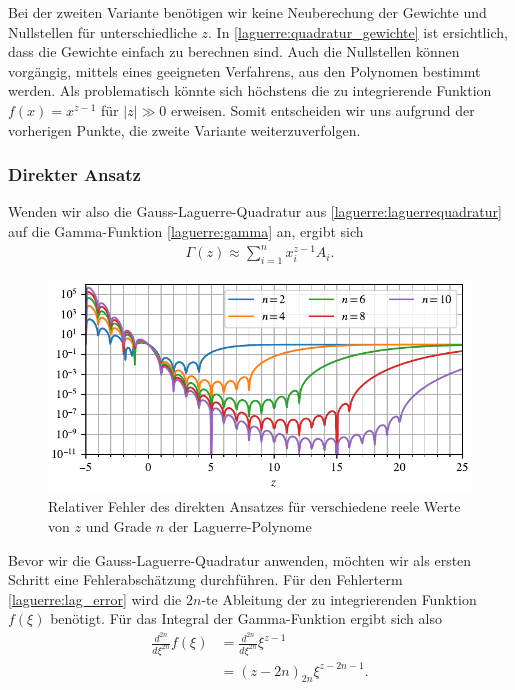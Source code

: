Bei der zweiten Variante benötigen wir keine Neuberechung der Gewichte
und Nullstellen für unterschiedliche $z$.
In \eqref{laguerre:quadratur_gewichte} ist ersichtlich,
dass die Gewichte einfach zu berechnen sind.
Auch die Nullstellen können vorgängig,
mittels eines geeigneten Verfahrens,
aus den Polynomen bestimmt werden.
Als problematisch könnte sich höchstens
die zu integrierende Funktion $f(x)=x^{z-1}$ für $|z| \gg 0$ erweisen.
Somit entscheiden wir uns aufgrund der vorherigen Punkte,
die zweite Variante weiterzuverfolgen.

\subsubsection{Direkter Ansatz}
Wenden wir also die Gauss-Laguerre-Quadratur aus
\eqref{laguerre:laguerrequadratur} auf die Gamma-Funktion
\eqref{laguerre:gamma} an,
ergibt sich
\begin{align}
\Gamma(z)
\approx
\sum_{i=1}^n x_i^{z-1} A_i.
\label{laguerre:naive_lag}
\end{align}
%
\begin{figure}
\centering
% 
\includegraphics{papers/laguerre/images/rel_error_simple.pdf}
\caption{Relativer Fehler des direkten Ansatzes
für verschiedene reele Werte von $z$ und Grade $n$ der Laguerre-Polynome}
\label{laguerre:fig:rel_error_simple}
\end{figure}
%
Bevor wir die Gauss-Laguerre-Quadratur anwenden,
möchten wir als ersten Schritt eine Fehlerabschätzung durchführen.
Für den Fehlerterm \eqref{laguerre:lag_error} wird die $2n$-te Ableitung
der zu integrierenden Funktion $f(\xi)$ benötigt.
Für das Integral der Gamma-Funktion ergibt sich also
\begin{align*}
\frac{d^{2n}}{d\xi^{2n}} f(\xi)
 & =
\frac{d^{2n}}{d\xi^{2n}} \xi^{z-1}
\\
 & =
(z - 2n)_{2n} \xi^{z - 2n - 1}
.
\end{align*}
